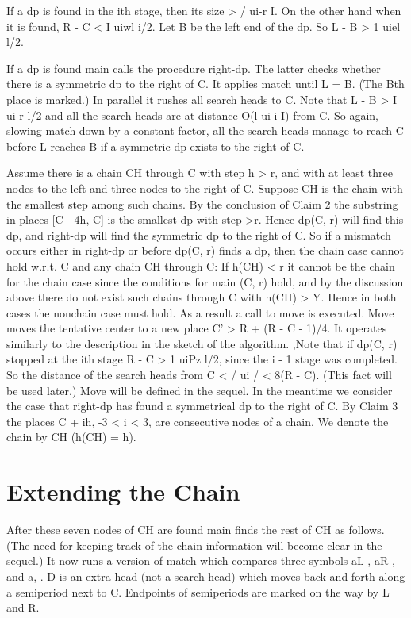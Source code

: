 \documentclass[11pt,a4paper]{report}
\begin{document}
If a dp is found in the ith stage, then its size > / ui-r I. On the other hand when it is
found, R - C < I uiwl i/2. Let B be the left end of the dp. So L - B > 1 uiel l/2.

If a dp is found main calls the procedure right-dp. The latter checks whether there is a
symmetric dp to the right of C. It applies match until L = B. (The Bth place is marked.)
In parallel it rushes all search heads to C. Note that L - B > I ui-r l/2 and all the search
heads are at distance O(l ui-i I) from C. So again, slowing match down by a constant
factor, all the search heads manage to reach C before L reaches B if a symmetric dp
exists to the right of C.

Assume there is a chain CH through C with step h > r, and with at least three nodes
to the left and three nodes to the right of C. Suppose CH is the chain with the smallest
step among such chains. By the conclusion of Claim 2 the substring in places [C - 4h, C]
is the smallest dp with step >r. Hence dp(C, r) will find this dp, and right-dp will find
the symmetric dp to the right of C. So if a mismatch occurs either in right-dp or before
dp(C, r) finds a dp, then the chain case cannot hold w.r.t. C and any chain CH through
C: If h(CH) < r it cannot be the chain for the chain case since the conditions for main
(C, r) hold, and by the discussion above there do not exist such chains through C with
h(CH) > Y. Hence in both cases the nonchain case must hold. As a result a call to move
is executed. Move moves the tentative center to a new place C’ > R + (R - C - 1)/4.
It operates similarly to the description in the sketch of the algorithm. ,Note that if dp(C, r)
stopped at the ith stage R - C > 1 uiPz l/2, since the i - 1 stage was completed. So the
distance of the search heads from C < / ui / < 8(R - C). (This fact will be used later.)
Move will be defined in the sequel. In the meantime we consider the case that right-dp
has found a symmetrical dp to the right of C. By Claim 3 the places C + ih, -3 < i < 3,
are consecutive nodes of a chain. We denote the chain by CH (h(CH) = h). 




\chapter{Extending the Chain}


After these seven nodes of CH are found main finds the rest of CH as follows. (The
need for keeping track of the chain information will become clear in the sequel.) It now
runs a version of match which compares three symbols aL , aR , and a, . D is an extra
head (not a search head) which moves back and forth along a semiperiod next to C.
Endpoints of semiperiods are marked on the way by L and R.
\end{document}
